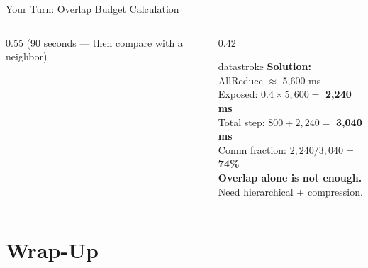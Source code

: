 \documentclass[aspectratio=169, 12pt]{beamer}
\begin{document}
\begin{frame}{Your Turn: Overlap Budget Calculation}
\begin{columns}[T]
\begin{column}{0.55\textwidth}
    {\footnotesize\textcolor{midgray}{(90 seconds --- then compare with a neighbor)}}
  \end{column}
  \begin{column}{0.42\textwidth}
    \pause
    \begin{mlsyscard}{datastroke}
    \textbf{Solution:}\\[0.1cm]
    {\footnotesize
    AllReduce $\approx$ 5,600 ms\\
    Exposed: $0.4 \times 5{,}600 = $ \textbf{2,240 ms}\\
    Total step: $800 + 2{,}240 =$ \textbf{3,040 ms}\\
    Comm fraction: $2{,}240/3{,}040 =$ \textbf{74\%}\\[0.1cm]
    \textcolor{errorstroke}{\textbf{Overlap alone is not enough.}}\\
    Need hierarchical + compression.
    }
    \end{mlsyscard}
  \end{column}
\end{columns}

\end{frame}

\section{Wrap-Up}
\end{document}
